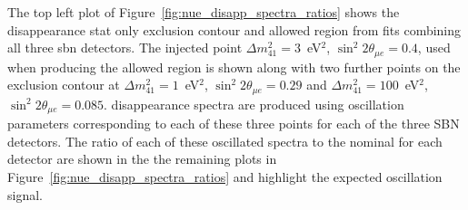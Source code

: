 The top left plot of Figure~\ref{fig:nue_disapp_spectra_ratios} shows the \nue disappearance stat only exclusion contour and allowed region from fits combining all three \gls{sbn} detectors. The injected point \mbox{$\Delta m^2_{41} = 3$~eV$^2$}, $\sin^2{2\theta_{\mu e}} = 0.4$, used when producing the allowed region is shown along with two further points on the exclusion contour at \mbox{$\Delta m^2_{41} = 1$ eV$^2$}, $\sin^2{2\theta_{\mu e}} = 0.29$ and $\Delta m^2_{41} = 100$~eV$^2$, $\sin^2{2\theta_{\mu e}} = 0.085$. \nue disappearance spectra are produced using oscillation parameters corresponding to each of these three points for each of the three SBN detectors. The ratio of each of these oscillated spectra to the nominal for each detector are shown in the the remaining plots in Figure~\ref{fig:nue_disapp_spectra_ratios} and highlight the expected oscillation signal.


